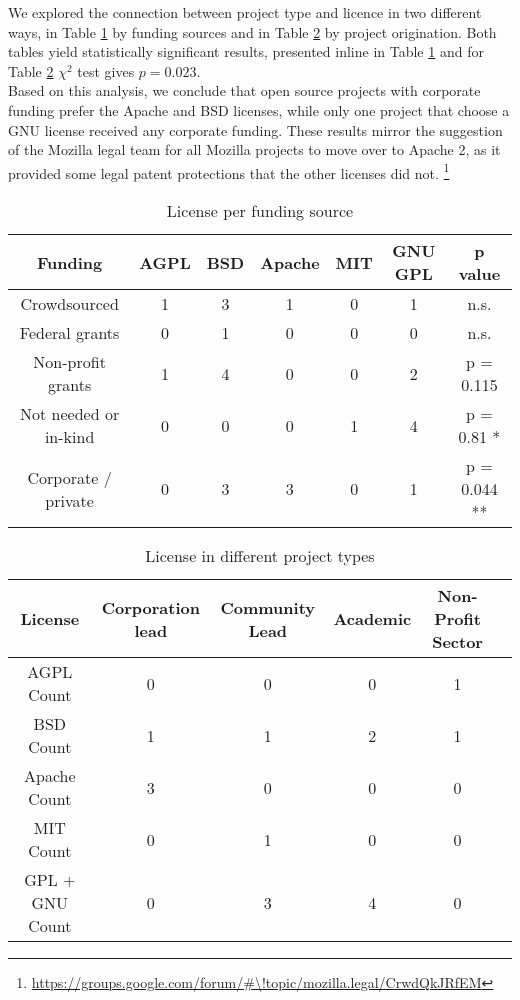 \noindent We explored the connection between project type and licence in two different ways, in Table \ref{tab:licence_per_funding} by funding sources and in Table \ref{tab:licence_per_project_type} by project origination. Both tables yield statistically significant results, presented inline in Table \ref{tab:licence_per_funding} and for Table \ref{tab:licence_per_project_type} $\chi^2$ test gives $p=0.023$.\\

\noindent Based on this analysis, we conclude that open source projects with corporate funding prefer the Apache and BSD licenses, while only one project that choose a GNU license received any corporate funding. These results mirror the suggestion of the Mozilla legal team for all Mozilla projects to move over to Apache 2, as it provided some legal patent protections that the other licenses did not. \footnote{\url{https://groups.google.com/forum/\#\!topic/mozilla.legal/CrwdQkJRfEM}}

\begin{table}[htbp]
  \centering
  \caption{License per funding source}
    \begin{tabular}{|c|c|c|c|c|c|c|}
    \hline
         Funding & AGPL  & BSD   & Apache & MIT   & GNU GPL & p value \\
\hline
    Crowdsourced & 1     & 3     & 1     & 0     & 1     & n.s. \\
    Federal grants & 0     & 1     & 0     & 0     & 0     & n.s. \\
    Non-profit grants & 1     & 4     & 0     & 0     & 2     & p = 0.115 \\
    Not needed or in-kind & 0     & 0     & 0     & 1     & 4     & p = 0.81 * \\
    Corporate / private & 0     & 3     & 3     & 0     & 1     & p = 0.044 ** \\
\hline    
    \end{tabular}
  \label{tab:licence_per_funding}
\end{table}

\begin{table}[htbp]
  \centering
  \caption{License in different project types}
    \begin{tabular}{|c|c|c|c|c|c|}
	\hline
          License & Corporation lead & Community Lead & Academic & Non-Profit Sector \\
    \hline
    AGPL Count & 0     & 0     & 0     & 1 \\
    BSD  Count & 1     & 1     & 2     & 1 \\
    Apache Count & 3     & 0     & 0     & 0 \\
    MIT  Count & 0     & 1     & 0     & 0 \\
    GPL + GNU Count & 0     & 3     & 4     & 0 \\
    \hline
    \end{tabular}
  \label{tab:licence_per_project_type}
\end{table}%
